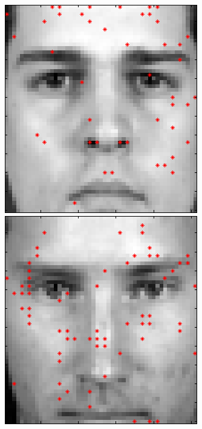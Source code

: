\begin{figure}[ht]
 \includegraphics[width=\textwidth*11/100]{ch5/figures/FeaturesonFace_BGC1.png}
 \includegraphics[width=\textwidth*11/100]{ch5/figures/FeaturesonFace_BGC2.png}

\end{figure}
